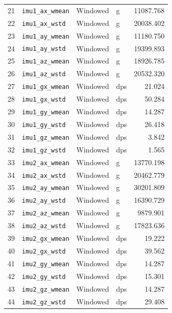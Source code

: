 \documentclass[11pt]{article}
\begin{document}
\begin{table}[H]
\begin{tabular}{clllr}
21  & \texttt{imu1\_ax\_wmean}    & Windowed & g     &  11087.768 \\
22  & \texttt{imu1\_ax\_wstd}     & Windowed & g     &  20038.402 \\
23  & \texttt{imu1\_ay\_wmean}    & Windowed & g     &  11180.750 \\
24  & \texttt{imu1\_ay\_wstd}     & Windowed & g     &  19399.893 \\
25  & \texttt{imu1\_az\_wmean}    & Windowed & g     &  18926.785 \\
26  & \texttt{imu1\_az\_wstd}     & Windowed & g     &  20532.320 \\
27  & \texttt{imu1\_gx\_wmean}    & Windowed & dps   &     21.024 \\
28  & \texttt{imu1\_gx\_wstd}     & Windowed & dps   &     50.284 \\
29  & \texttt{imu1\_gy\_wmean}    & Windowed & dps   &     14.287 \\
30  & \texttt{imu1\_gy\_wstd}     & Windowed & dps   &     26.418 \\
31  & \texttt{imu1\_gz\_wmean}    & Windowed & dps   &      3.842 \\
32  & \texttt{imu1\_gz\_wstd}     & Windowed & dps   &      1.565 \\
33  & \texttt{imu2\_ax\_wmean}    & Windowed & g     &  13770.198 \\
34  & \texttt{imu2\_ax\_wstd}     & Windowed & g     &  20462.779 \\
35  & \texttt{imu2\_ay\_wmean}    & Windowed & g     &  30201.809 \\
36  & \texttt{imu2\_ay\_wstd}     & Windowed & g     &  16390.729 \\
37  & \texttt{imu2\_az\_wmean}    & Windowed & g     &   9879.901 \\
38  & \texttt{imu2\_az\_wstd}     & Windowed & g     &  17823.636 \\
39  & \texttt{imu2\_gx\_wmean}    & Windowed & dps   &     19.222 \\
40  & \texttt{imu2\_gx\_wstd}     & Windowed & dps   &     39.562 \\
41  & \texttt{imu2\_gy\_wmean}    & Windowed & dps   &     14.287 \\
42  & \texttt{imu2\_gy\_wstd}     & Windowed & dps   &     15.301 \\
43  & \texttt{imu2\_gz\_wmean}    & Windowed & dps   &     14.287 \\
44  & \texttt{imu2\_gz\_wstd}     & Windowed & dps   &     29.408 \\
\bottomrule
\end{tabular}
\end{table}
\end{document}
